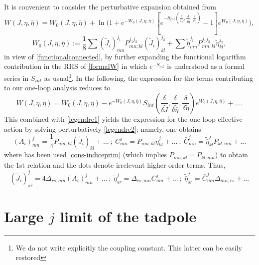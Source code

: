 \documentclass[a4paper,11pt]{article}
\numberwithin{equation}{section}
\theoremstyle{nonumberplain}
\begin{document}
It is convenient to consider the perturbative expansion obtained from
\begin{equation}
W(J,\eta,\bar\eta)=W_0(J,\eta,\bar\eta)+\ln\big(1+e^{-W_0(J,\eta,\bar\eta)}[e^{-S_{int}(\frac{\delta}{\delta \widetilde J},\frac{\delta}{\delta\widetilde{\bar\eta}},\frac{\delta}{\delta\widetilde{\eta}})}-1]e^{W_0(J,\eta,\bar\eta)} \big)\label{formalW},
\end{equation}
\begin{equation}
W_0(J,\eta,\bar\eta):=\frac{1}{8}\sum(\widetilde J_i)^{j_1}_{mn}P^{j_1 j_2}_{mn;kl} (\widetilde J_i)^{j_2}_{kl}+\sum\widetilde{\bar\eta}^{j_1}_{mn}P^{j_1 j_2}_{mn;kl}\widetilde{\eta}^{j_2}_{kl}\label{formalW0},
\end{equation}
in view of \eqref{functionalconnected}, by further expanding the functional logarithm contribution in the RHS of \eqref{formalW} in which $e^{-S_{int}}$ is understood as a formal series in $S_{int}$ as usual{\footnote{We do not write explicitly the coupling constant. This latter can be easily restored}}. In the following, the expression for the terms contributing to our one-loop analysis reduces to
\begin{equation}
W(J,\eta,\bar\eta)=W_0(J,\eta,\bar\eta)-e^{-W_0(J,\eta,\bar\eta)}S_{int}(\frac{\delta}{\delta \widetilde J},\frac{\delta}{\delta\widetilde{\bar\eta}},\frac{\delta}{\delta\widetilde\eta})e^{W_0(J,\eta,\bar\eta)}+...\label{1loopgeneric}.
\end{equation}
This combined with \eqref{legendre1} yields the expression for the one-loop effective action by solving perturbatively \eqref{legendre2}; namely, one obtains
\begin{equation}
(A_i)^j_{mn}=\frac{1}{4}P_{nm;kl}(\widetilde J_i)_{kl}+...\ ;\ C^j_{mn}=P_{nm;kl}\widetilde\eta^j_{kl} +...\ ;\ \bar C^j_{mn}=\widetilde{\bar\eta}^j_{kl}P_{kl;nm} +...\label{legendreinter}
\end{equation}
where has been used \eqref{cons-indiceprim} (which implies $P_{mn;kl}=P_{kl;mn}$) to obtain the 1st relation and the dots  denote irrelevant higher order terms. Thus,
\begin{equation}
(\widetilde J_i)^j_{sr}=4\Delta_{rs;mn}(A_i)^j_{mn}+...\ ;\ \widetilde\eta^j_{sr}=\Delta_{rs;mn}C^j_{mn}+...\ ;\ \widetilde{\bar\eta}^j_{sr}=\bar C^j_{mn}\Delta_{mn;rs}+...\label{inverslegendre}
\end{equation}
\section{\texorpdfstring{Large $j$ limit of the tadpole}{Large j limit }}\label{appendix2}
\end{document}
